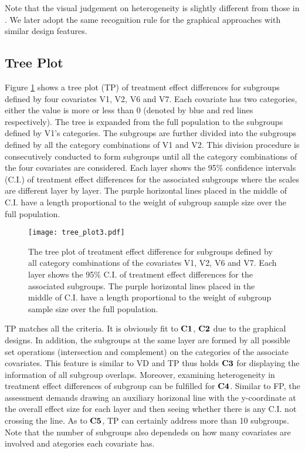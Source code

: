 \documentclass[Afour,sagev,times, doublespace]{sagej}
\begin{document}
{Note that the visual judgement on heterogeneity is slightly different from those in \cite{Alosh:16, Cuzick:05, Ried:06}. We later adopt the same recognition rule for the graphical approaches with similar design features.

\subsection{Tree Plot}

Figure \ref{fig:TP} shows a tree plot (TP) of treatment effect differences for subgroups defined by four covariates V1, V2, V6 and V7. Each covariate has two categories, either the value is more or less than 0 (denoted by blue and red lines respectively). The tree is expanded from the full population to the subgroups defined by V1's categories. The subgroups are further divided into the subgroups defined by all the category combinations of V1 and V2. This division procedure is consecutively conducted to form subgroups until all the category combinations of the four covariates are considered. Each layer shows the 95\% confidence intervals (C.I.) of treatment effect differences for the associated subgroups where the scales are different layer by layer. The purple horizontal lines placed in the middle of C.I. have a length proportional to the weight of subgroup sample size over the full population.

\begin{figure}%
\begin{center}
	\texttt{[image: tree\_plot3.pdf]} \\
		\caption{The tree plot of treatment effect difference for subgroups defined by all category combinations of the covariates V1, V2, V6 and V7. Each layer shows the 95\% C.I. of treatment effect differences for the associated subgroups. The purple horizontal lines placed in the middle of C.I. have a length proportional to the weight of subgroup sample size over the full population.}\label{fig:TP}
\end{center}
\end{figure}

TP matches all the criteria. It is obviously fit to $\bf C1$, $\bf C2$ due to the graphical designs. In addition, the subgroups at the same layer are formed by all possible set operations (intersection and complement) on the categories of the associate covariates. This feature is similar to VD and TP thus holds $\bf C3$ for displaying the information of all subgroup overlaps. Moreover, examining heterogeneity in treatment effect differences of subgroup can be fulfilled for $\bf C4$. Similar to FP, the assessment demands drawing an auxiliary horizonal line with the y-coordinate at the overall effect size for each layer and then seeing whether there is any C.I. not crossing the line. As to $\bf C5$, TP can certainly address more than 10 subgroups. Note that the number of subgroups also dependeds on how many covariates are involved and ategories each covariate has.

}
\end{document}
